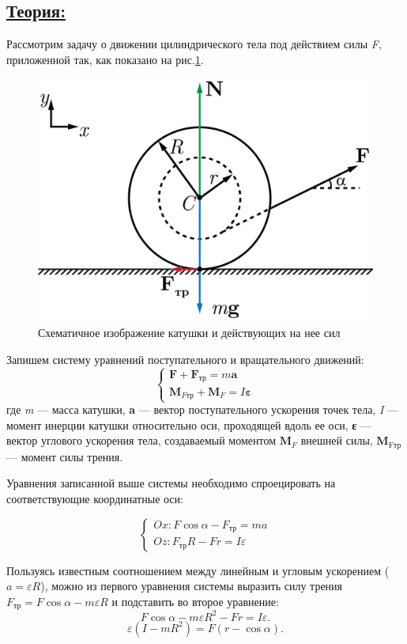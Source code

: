 \documentclass[14pt,a4paper,oneside]{extarticle}	%
\begin{document}
\newpage
\subsection*{\underline{Теория:}}
Рассмотрим задачу о движении цилиндрического тела под действием силы \textit{F}, приложенной так, как показано на рис.\ref{roll-3}.

\begin{figure}[H] 
	\centering 		
	\includegraphics[width=0.6\linewidth]{roll-3.png} 
	\caption{Схематичное изображение катушки и действующих на нее сил}
	\label{roll-3}
\end{figure}

Запишем систему уравнений поступательного и вращательного движений:
\begin{equation}\label{roll-eq1}
\begin{cases}
\textbf{F} + \textbf{F}_{\text{тр}} = m\textbf{a} \\
\textbf{M}_{F\text{тр}} + \textbf{M}_F= I\textbf{ε}
\end{cases}
\end{equation}
где \textit{m} — масса катушки, \textbf{a} — вектор поступательного ускорения точек тела, \textit{I} — момент инерции катушки относительно оси, проходящей вдоль ее оси, \textbf{ε} — вектор углового ускорения тела, создаваемый моментом $ \textbf{M}_F $ внешней силы, $ \textbf{M}_{\text{Fтр}} $ — момент силы трения.

Уравнения записанной выше системы необходимо спроецировать на соответствующие координатные оси:

\begin{equation}\label{roll-eq2}
\begin{cases}
Ox: F\cos\alpha - F_{\text{тр}} = ma \\
Oz: F_{\text{тр}}R - Fr= I \varepsilon
\end{cases}
\end{equation}

Пользуясь известным соотношением между линейным и угловым ускорением ($ a = \varepsilon R $), можно из первого уравнения системы выразить силу трения $  F_{\text{тр}} = F\cos\alpha - m  \varepsilon R $ и подставить во второе уравнение:
\begin{equation}\label{roll-eq3}
F\cos\alpha - m  \varepsilon R^{2} - Fr= I \varepsilon.
\end{equation}
\begin{equation}\label{roll-eq4}
 \varepsilon (I  - mR^{2})  = F (r -\cos\alpha).
\end{equation}
\end{document}

